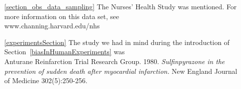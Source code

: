 \begin{itemize}
\item[\ref{section_obs_data_sampling}]
    The Nurses' Health Study was mentioned.
    For more information on this data set, see \\
        {www.channing.harvard.edu/nhs}

\item[\ref{experimentsSection}]
    The study we had in mind during the introduction of
    Section~\ref{biasInHumanExperiments} was \\
    Anturane Reinfarction Trial Research Group. 1980.
    \emph{Sulfinpyrazone in the prevention of sudden
    death after myocardial infarction.}
    New England Journal of Medicine 302(5):250-256.
\end{itemize}




\D{\newpage}




